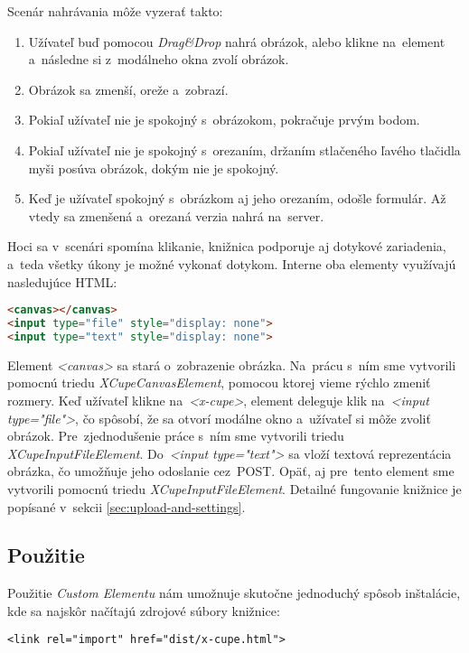 Scenár nahrávania môže vyzerať takto:
\begin{enumerate}
	\item Užívateľ buď pomocou \emph{Drag\&Drop} nahrá obrázok, alebo klikne na~element a~následne si z~modálneho okna zvolí obrázok.
	\item Obrázok sa zmenší, oreže a~zobrazí.
	\item Pokiaľ užívateľ nie je spokojný s~obrázokom, pokračuje prvým bodom.
	\item Pokiaľ užívateľ nie je spokojný s~orezaním, držaním stlačeného ľavého tlačidla myši posúva obrázok, dokým nie je spokojný.
	\item Keď je užívateľ spokojný s~obrázkom aj jeho orezaním, odošle formulár. Až vtedy sa zmenšená a~orezaná verzia nahrá na~server.
\end{enumerate}

Hoci sa v~scenári spomína klikanie, knižnica podporuje aj dotykové zariadenia, a~teda všetky úkony je možné vykonať dotykom. Interne oba elementy využívajú nasledujúce HTML:

\begin{lstlisting}[language=HTML,caption=Interná štruktúra elementov \emph{<x-cupe>} a~\emph{<x-cupe-gallery>}.]
<canvas></canvas>
<input type="file" style="display: none">
<input type="text" style="display: none">
\end{lstlisting}


Element \emph{<canvas>} sa stará o~zobrazenie obrázka. Na~prácu s~ním sme vytvorili pomocnú triedu \emph{XCupeCanvasElement}, pomocou ktorej vieme rýchlo zmeniť rozmery. Keď užívateľ klikne na~\emph{<x-cupe>}, element deleguje klik na~\emph{<input type="file"\textgreater}, čo spôsobí, že sa otvorí modálne okno a~užívateľ si môže zvoliť obrázok. Pre~zjednodušenie práce s~ním sme vytvorili triedu \emph{XCupeInputFileElement}. Do~\emph{<input type="text"\textgreater} sa vloží textová reprezentácia obrázka, čo umožňuje jeho odoslanie cez~POST. Opäť, aj pre~tento element sme vytvorili pomocnú triedu \emph{XCupeInputFileElement}. Detailné fungovanie knižnice je popísané v~sekcii \ref{sec:upload-and-settings}.

\subsection{Použitie}

Použitie \emph{Custom Elementu} nám umožnuje skutočne jednoduchý spôsob inštalácie, kde sa najskôr načítajú zdrojové súbory knižnice:
\begin{lstlisting}
<link rel="import" href="dist/x-cupe.html">
\end{lstlisting}

